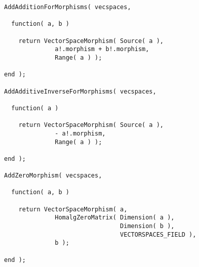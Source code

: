 \begin{small}
\begin{Verbatim}[frame=single]
AddAdditionForMorphisms( vecspaces,
                         
  function( a, b )
    
    return VectorSpaceMorphism( Source( a ),
              a!.morphism + b!.morphism,
              Range( a ) );
    
end );

AddAdditiveInverseForMorphisms( vecspaces,
                                
  function( a )
    
    return VectorSpaceMorphism( Source( a ),
              - a!.morphism,
              Range( a ) );
    
end );

AddZeroMorphism( vecspaces,
                     
  function( a, b )
    
    return VectorSpaceMorphism( a,
              HomalgZeroMatrix( Dimension( a ),
                                Dimension( b ),
                                VECTORSPACES_FIELD ),
              b );
    
end );
\end{Verbatim}
\end{small}